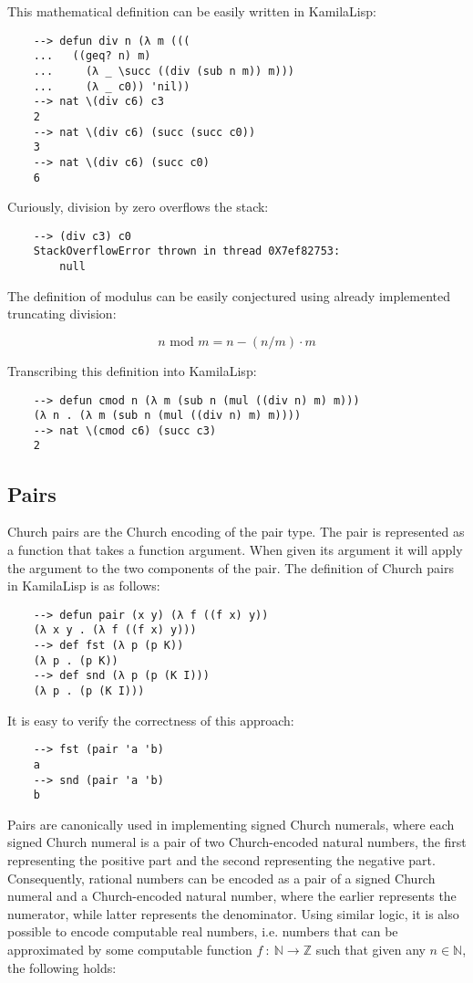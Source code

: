 This mathematical definition can be easily written in KamilaLisp:

\begin{Verbatim}
    --> defun div n (λ m (((
    ...   ((geq? n) m)
    ...     (λ _ \succ ((div (sub n m)) m)))
    ...     (λ _ c0)) 'nil))
    --> nat \(div c6) c3
    2
    --> nat \(div c6) (succ (succ c0))
    3
    --> nat \(div c6) (succ c0)
    6
\end{Verbatim}

Curiously, division by zero overflows the stack:

\begin{Verbatim}
    --> (div c3) c0
    StackOverflowError thrown in thread 0X7ef82753:
        null
\end{Verbatim}

The definition of modulus can be easily conjectured using already implemented truncating division:

$$
n\text{ mod }m = n - (n/m) \cdot m
$$

Transcribing this definition into KamilaLisp:

\begin{Verbatim}
    --> defun cmod n (λ m (sub n (mul ((div n) m) m)))
    (λ n . (λ m (sub n (mul ((div n) m) m))))
    --> nat \(cmod c6) (succ c3)
    2
\end{Verbatim}

\subsection{Pairs}

Church pairs are the Church encoding of the pair type. The pair is represented as a function that takes a function argument. When given its argument it will apply the argument to the two components of the pair. The definition of Church pairs in KamilaLisp is as follows:

\begin{Verbatim}
    --> defun pair (x y) (λ f ((f x) y))
    (λ x y . (λ f ((f x) y)))
    --> def fst (λ p (p K))
    (λ p . (p K))
    --> def snd (λ p (p (K I)))
    (λ p . (p (K I)))
\end{Verbatim}

It is easy to verify the correctness of this approach:

\begin{Verbatim}
    --> fst (pair 'a 'b)
    a
    --> snd (pair 'a 'b)
    b
\end{Verbatim}

Pairs are canonically used in implementing signed Church numerals, where each signed Church numeral is a pair of two Church-encoded natural numbers, the first representing the positive part and the second representing the negative part. Consequently, rational numbers can be encoded as a pair of a signed Church numeral and a Church-encoded natural number, where the earlier represents the numerator, while latter represents the denominator. Using similar logic, it is also possible to encode computable real numbers, i.e. numbers that can be approximated by some computable function  $f\ :\ \mathbb{N} \to \mathbb{Z}$ such that given any $n \in \mathbb{N}$, the following holds:

